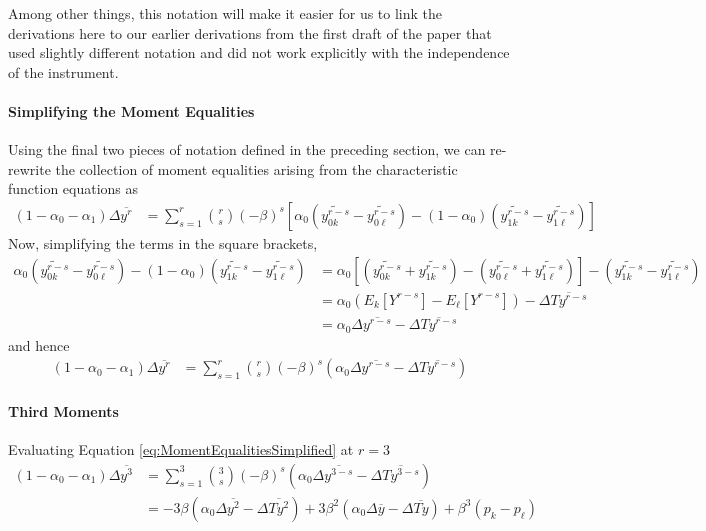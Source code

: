 \documentclass[12pt]{article}
\begin{document}
Among other things, this notation will make it easier for us to link the derivations here to our earlier derivations from the first draft of the paper that used slightly different notation and did not work explicitly with the independence of the instrument.

\paragraph{Simplifying the Moment Equalities}
Using the final two pieces of notation defined in the preceding section, we can re-rewrite the collection of moment equalities arising from the characteristic function equations as
\begin{align*}
  (1 - \alpha_0 - \alpha_1) \Delta \overline{y^r} 
  &= \sum_{s=1}^r {r \choose s} (-\beta)^s \left[\alpha_0 \left( \widetilde{y^{r-s}_{0k}} - \widetilde{y^{r-s}_{0\ell}} \right) - (1 - \alpha_0) \left( \widetilde{y^{r-s}_{1k}} - \widetilde{y^{r-s}_{1\ell}} \right) \right]
\end{align*}
Now, simplifying the terms in the square brackets,
\begin{align*}
  \alpha_0 \left( \widetilde{y^{r-s}_{0k}} - \widetilde{y^{r-s}_{0\ell}} \right) - (1 - \alpha_0) \left( \widetilde{y^{r-s}_{1k}} - \widetilde{y^{r-s}_{1\ell}} \right)
  &= \alpha_0\left[ \left( \widetilde{y_{0k}^{r-s}} + \widetilde{y_{1k}^{r-s}} \right) - \left( \widetilde{y_{0\ell}^{r-s}} + \widetilde{y_{1\ell}^{r-s}} \right)  \right] - \left( \widetilde{y^{r-s}_{1k}} - \widetilde{y^{r-s}_{1\ell}} \right)\\
  &= \alpha_0\left( E_k[Y^{r-s}] - E_\ell[Y^{r-s}] \right) - \Delta \overline{Ty^{r-s}}\\
  &= \alpha_0 \Delta \overline{y^{r-s}} - \Delta\overline{Ty^{r-s}}
\end{align*}
and hence
\begin{align}
  (1 - \alpha_0 - \alpha_1) \Delta \overline{y^r} 
  &= \sum_{s=1}^r {r \choose s} (-\beta)^s \left( \alpha_0 \Delta\overline{y^{r-s}} - \Delta\overline{Ty^{r-s}} \right) 
  \label{eq:MomentEqualitiesSimplified}
\end{align}

\paragraph{Third Moments}
Evaluating Equation \ref{eq:MomentEqualitiesSimplified} at $r=3$ 
\begin{align*}
  (1 - \alpha_0 - \alpha_1) \Delta \overline{y^3} 
  &= \sum_{s=1}^3 {3 \choose s} (-\beta)^s \left( \alpha_0 \Delta\overline{y^{3-s}} - \Delta\overline{Ty^{3-s}} \right) \\
  &= -3\beta\left( \alpha_0 \Delta\overline{y^2} - \Delta\overline{Ty^2} \right) + 3\beta^2\left( \alpha_0 \Delta\overline{y} - \Delta\overline{Ty} \right) + \beta^3 (p_k - p_\ell)
\end{align*}
\end{document}
